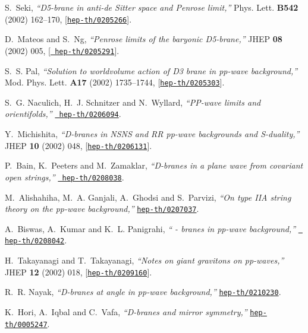 \documentclass[a4paper,12pt]{article}
\numberwithin{equation}{section}
\begin{document}
\begin{thebibliography}{10}
S.~Seki, {\it ``{D}5-brane in anti-de {S}itter space and {P}enrose limit,''}
  Phys. Lett. {\bf B542} (2002) 162--170,
  [\href{http://arXiv.org/abs/hep-th/0205266}{{\tt hep-th/0205266}}].

D.~Mateos and S.~Ng, {\it ``{P}enrose limits of the baryonic {D}5-brane,''}
  JHEP {\bf 08} (2002) 005, [\href{http://arXiv.org/abs/hep-th/0205291}{{\tt
  hep-th/0205291}}].

S.~S. Pal, {\it ``Solution to worldvolume action of {D}3 brane in pp-wave
  background,''}  Mod. Phys. Lett. {\bf A17} (2002) 1735--1744,
  [\href{http://arXiv.org/abs/hep-th/0205303}{{\tt hep-th/0205303}}].

S.~G. Naculich, H.~J. Schnitzer and N.~Wyllard, {\it ``{PP}-wave limits and
  orientifolds,''}  \href{http://arXiv.org/abs/hep-th/0206094}{{\tt
  hep-th/0206094}}.

Y.~Michishita, {\it ``{D}-branes in {NSNS} and {RR} pp-wave backgrounds and
  {S}-duality,''}  JHEP {\bf 10} (2002) 048,
  [\href{http://arXiv.org/abs/hep-th/0206131}{{\tt hep-th/0206131}}].

P.~Bain, K.~Peeters and M.~Zamaklar, {\it ``{D}-branes in a plane wave from
  covariant open strings,''}  \href{http://arXiv.org/abs/hep-th/0208038}{{\tt
  hep-th/0208038}}.

M.~Alishahiha, M.~A. Ganjali, A.~Ghodsi and S.~Parvizi, {\it ``On type {IIA}
  string theory on the pp-wave background,''}
  \href{http://arXiv.org/abs/hep-th/0207037}{{\tt hep-th/0207037}}.

A.~Biswas, A.~Kumar and K.~L. Panigrahi, {\it ``{\coordHE{} - \coordHE{}} branes in pp-wave
  background,''}  \href{http://arXiv.org/abs/hep-th/0208042}{{\tt
  hep-th/0208042}}.

H.~Takayanagi and T.~Takayanagi, {\it ``Notes on giant gravitons on
  pp-waves,''}  JHEP {\bf 12} (2002) 018,
  [\href{http://arXiv.org/abs/hep-th/0209160}{{\tt hep-th/0209160}}].

R.~R. Nayak, {\it ``D-branes at angle in pp-wave background,''}
  \href{http://arXiv.org/abs/hep-th/0210230}{{\tt hep-th/0210230}}.

K.~Hori, A.~Iqbal and C.~Vafa, {\it ``{D}-branes and mirror symmetry,''}
  \href{http://arXiv.org/abs/hep-th/0005247}{{\tt hep-th/0005247}}.


\end{thebibliography}
\end{document}
